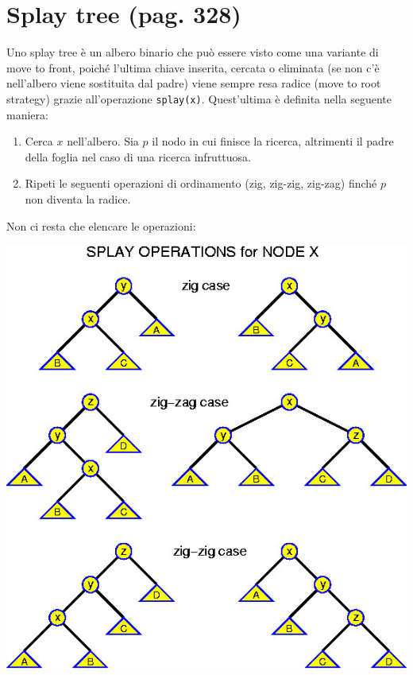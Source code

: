 \documentclass[a4paper]{book}
\newcommand{\inline}[1]{\lstinline!#1!}%
\begin{document}
\section{Splay tree (pag. 328)}
Uno splay tree è un albero binario che può essere visto come una variante di move to front, poiché l'ultima chiave inserita, cercata o eliminata (se non c'è nell'albero viene sostituita dal padre) viene sempre resa radice (move to root strategy) grazie all'operazione \inline{splay(x)}. Quest'ultima è definita nella seguente maniera:
\begin{enumerate}
\item Cerca $x$ nell'albero. Sia $p$ il nodo in cui finisce la ricerca, altrimenti il padre della foglia nel caso di una ricerca infruttuosa.
\item Ripeti le seguenti operazioni di ordinamento (zig, zig-zig, zig-zag) finché $p$ non diventa la radice.
\end{enumerate}
Non ci resta che elencare le operazioni:
\begin{center}
\includegraphics[scale=0.5]{Figures/splay.jpg}
\end{center}
\end{document}
